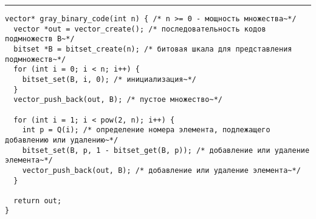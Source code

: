 \documentclass{article}
\begin{document}
\lstset{language = C,
    extendedchars = \true,
    keepspaces = true,
    breaklines=true,
    frame=lines}
\hrule
\begin{lstlisting}[title=\textbf {Алгоритм 1.2} Построение бинарного кода Грея]
vector* gray_binary_code(int n) { /* n >= 0 - мощность множества~*/
  vector *out = vector_create(); /* последовательность кодов подмножеств B~*/
  bitset *B = bitset_create(n); /* битовая шкала для представления подмножеств~*/
  for (int i = 0; i < n; i++) {
    bitset_set(B, i, 0); /* инициализация~*/
  }
  vector_push_back(out, B); /* пустое множество~*/

  for (int i = 1; i < pow(2, n); i++) {
    int p = Q(i); /* определение номера элемента, подлежащего добавлению или удалению~*/
    bitset_set(B, p, 1 - bitset_get(B, p)); /* добавление или удаление элемента~*/
    vector_push_back(out, B); /* добавление или удаление элемента~*/
  }

  return out;
}
\end{lstlisting}
\end{document}

